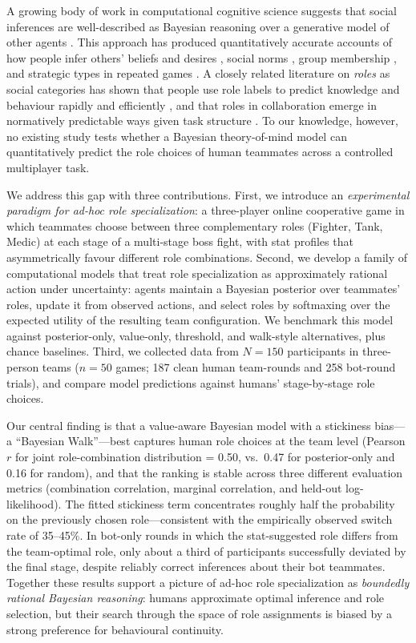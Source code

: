 \documentclass[9pt,twocolumn,twoside]{pnas-new}
\begin{document}
A growing body of work in computational cognitive science suggests that
social inferences are well-described as Bayesian reasoning over a
generative model of other agents
\cite{baker2017rational, ho2022planning, griffiths2010probabilistic}. This
approach has produced quantitatively accurate accounts of how people infer
others' beliefs and desires \cite{baker2017rational}, social norms
\cite{tan2019norms}, group membership \cite{davis2022inferring}, and
strategic types in repeated games \cite{lambaBayesianCoordination}. A
closely related literature on \emph{roles} as social categories has shown
that people use role labels to predict knowledge and behaviour rapidly and
efficiently \cite{bakerRolesGuideRapida, bakerPeopleUseMixed2025}, and that
roles in collaboration emerge in normatively predictable ways given task
structure \cite{mieczkowski2024specialization}. To our knowledge, however,
no existing study tests whether a Bayesian theory-of-mind model can
quantitatively predict the role choices of human teammates across a
controlled multiplayer task.

We address this gap with three contributions. First, we introduce an
\emph{experimental paradigm for ad-hoc role specialization}: a three-player
online cooperative game in which teammates choose between three
complementary roles (Fighter, Tank, Medic) at each stage of a multi-stage
boss fight, with stat profiles that asymmetrically favour different role \Endparasplit
combinations. Second, we develop a family of computational models that
treat role specialization as approximately rational action under
uncertainty: agents maintain a Bayesian posterior over teammates' roles,
update it from observed actions, and select roles by softmaxing over the
expected utility of the resulting team configuration. We benchmark this
model against posterior-only, value-only, threshold, and walk-style
alternatives, plus chance baselines. Third, we collected data from $N{=}150$
participants in three-person teams ($n{=}50$ games; 187 clean human team-rounds
and 258 bot-round trials), and compare model predictions against humans'
stage-by-stage role choices.

Our central finding is that a value-aware Bayesian model with a
stickiness bias---a ``Bayesian Walk''---best captures human role
choices at the team level (Pearson $r$ for joint role-combination
distribution = 0.50, vs.\ 0.47 for posterior-only and 0.16 for random),
and that the ranking is stable across three different evaluation metrics
(combination correlation, marginal correlation, and held-out
log-likelihood). The fitted stickiness term concentrates roughly half
the probability on the previously chosen role---consistent with the
empirically observed switch rate of 35--45\%. In bot-only rounds in
which the stat-suggested role differs from the team-optimal role, only
about a third of participants successfully deviated by the final stage,
despite reliably correct inferences about their bot teammates. Together
these results support a picture of ad-hoc role specialization as
\emph{boundedly rational Bayesian reasoning}: humans approximate optimal
inference and role selection, but their search through the space of role
assignments is biased by a strong preference for behavioural continuity.
\end{document}
